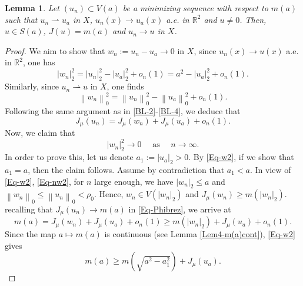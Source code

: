 \documentclass[11pt]{amsart}
\newtheorem{lemma}[theorem]{Lemma}
\numberwithin{equation}{section}
\begin{document}
{{{\begin{lemma} \label{5C2} Let $(u_n)\subset V(a)$ be a minimizing sequence with respect to $m(a)$ such that  $u_n \rightharpoonup u_a$ in $X$, \linebreak $u_n(x) \to u_a(x)$ a.e. in $\mathbb{R}^2$ and $u \not=0 $. Then, $u \in S(a)$, $J(u)=m(a)$ and $u_n \to u$ in $X$.
\end{lemma}}

\begin{proof}
    {We aim to show that $w_n:=u_n-u_a \rightarrow 0$ in $X$}, since $u_n(x) \to u(x)$ a.e. in $\mathbb{R}^2$, one has
    \begin{equation}\label{Eq-w2}
        \left|w_n\right|_2^2=\left|u_n\right|_2^2-\left|u_a\right|_2^2+o_n(1)=a^2-\left|u_a\right|_2^2+o_n(1).
    \end{equation}
    Similarly, since  $u_n \rightharpoonup u$ in $X$, one finds
    \begin{equation}\label{Eq-nw2}
        \left\|w_n\right\|_0^2=\left\| u_n\right\|_0^2-\left\| u_a\right\|_0^2+o_n(1).
    \end{equation}
    {Following the same argument as in \eqref{BL-2}-\eqref{BL-4}, we deduce that}
    \begin{equation}\label{Eq-Phibrez} J_\mu\left(u_n\right)=J_\mu\left(w_n\right)+J_\mu\left(u_a\right)+o_n(1).
    \end{equation}
    Now, we claim that
    $$
    \left |w_n\right  |_2^2 \rightarrow 0\quad\,\,\text{as}\quad\,\, n\rightarrow\infty.
    $$
    In order to prove this, let us denote $a_1:=\left|u_a\right|_2>0$. By \eqref{Eq-w2}, if we show that $a_1=a$, then the claim follows. Assume by contradiction that $a_1<a$. In view of \eqref{Eq-w2}, \eqref{Eq-nw2}, for $n$ large enough, we have $\left|w_n\right|_2 \leq a$ and $\left\| w_n\right\|_{0} \leq\left\| u_n\right\|_{0}<\rho_0$. Hence, $w_n \in V\left(\left|w_n\right|_2  \right)$ and $J_\mu\left(w_n\right) \geq m\left(\left|w_n\right|_2 \right)$. {recalling that $J_\mu\left(u_n\right) \rightarrow m(a)$ in \eqref{Eq-Phibrez}, we arrive at}
    \begin{equation}\label{Eq-mcc}
        m(a)=J_\mu\left(w_n\right)+J_\mu\left(u_a\right)+o_n(1) \geq m\left(\left|w_n\right|_2\right)+J_\mu\left(u_a\right)+o_n(1).
    \end{equation}
    Since the map $a \mapsto m(a)$ is continuous (see Lemma \ref{Lem4-m(a)cont}), \eqref{Eq-w2}  gives
    \begin{equation}\label{Eq-mc1}
        m(a) \geq m\left(\sqrt{a^2-a_1^2}\right)+J_\mu\left(u_a\right).

\end{equation}
\end{proof}}}
\end{document}
